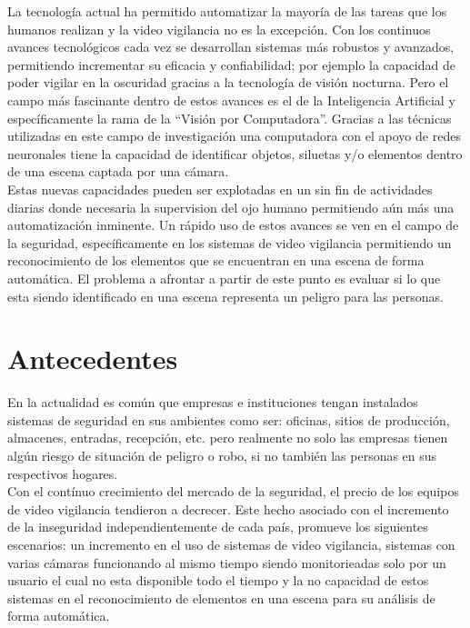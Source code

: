 La tecnología actual ha permitido automatizar la mayoría de las tareas que los humanos realizan y la video vigilancia no es la excepción. Con los continuos avances tecnológicos cada vez se desarrollan sistemas más robustos y avanzados, permitiendo incrementar su eficacia y confiabilidad; por ejemplo la capacidad de poder vigilar en la oscuridad gracias a la tecnología de visión nocturna. Pero el campo más fascinante dentro de estos avances es el de la Inteligencia Artificial y específicamente la rama de la ``Visión por Computadora''. Gracias a las técnicas utilizadas en este campo de investigación una computadora con el apoyo de redes neuronales tiene la capacidad de identificar objetos, siluetas y/o elementos dentro de una escena captada por una cámara.\\

Estas nuevas capacidades pueden ser explotadas en un sin fin de actividades diarias donde necesaria la supervision del ojo humano permitiendo aún más una automatización inminente. Un rápido uso de estos avances se ven en el campo de la seguridad, específicamente en los sistemas de video vigilancia permitiendo un reconocimiento de los elementos que se encuentran en una escena de forma automática. El problema a afrontar a partir de este punto es evaluar si lo que esta siendo identificado en una escena representa un peligro para las personas.

\section{Antecedentes}
En la actualidad es común que empresas e instituciones tengan instalados sistemas de seguridad en sus ambientes como ser: oficinas, sitios de producción, almacenes, entradas, recepción, etc. pero realmente no solo las empresas tienen algún riesgo de situación de peligro o robo, si no también las personas en sus respectivos hogares.\\

Con el contínuo crecimiento del mercado de la seguridad, el precio de los equipos de video vigilancia tendieron a decrecer. Este hecho asociado con el incremento de la inseguridad independientemente de cada país, promueve los siguientes escenarios: un incremento en el uso de sistemas de video vigilancia, sistemas con varias cámaras funcionando al mismo tiempo siendo monitorieadas solo por un usuario el cual no esta disponible todo el tiempo y la no capacidad de estos sistemas en el reconocimiento de  elementos en una escena para su análisis de forma automática.\\

